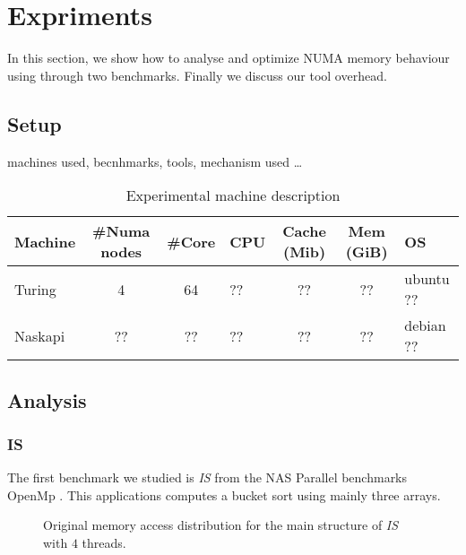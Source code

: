 \section{Expriments}
\label{sec:expe}
In this section, we show how to analyse and optimize NUMA memory behaviour using
\TABARNAC through two benchmarks. Finally we discuss our tool overhead.
\subsection{Setup}
\label{sec:expe-setup}
machines used, becnhmarks, tools, mechanism used \ldots

\begin{table}
    \centering
    \resizebox{\linewidth}{!}
    {
        \begin{tabular}{l|c|c|l|c|c|l}
            Machine & \#Numa nodes & \#Core & CPU & Cache (Mib) & Mem (GiB) & OS\\
            \hline
            Turing & 4 & 64 & ?? & ?? & ?? &  ubuntu ??\\
            \hline
            Naskapi & ?? &?? &?? &?? & ?? &debian ??\\
        \end{tabular}
    }
    \caption{Experimental machine description}
    \label{tab:machines}
\end{table}

\subsection{Analysis}
\label{sec:expe-analysis}

\subsubsection{IS}
The first benchmark we studied is \emph{IS} from the  NAS Parallel benchmarks OpenMp
\cite{Feng04Unstructured}. This applications computes a bucket sort using
mainly three arrays.

\begin{figure}[htb]
    \centering

    \caption{Original memory access distribution for the main structure of
        \emph{IS} with $4$ threads.}
    \label{fig:is-behaviour-orig}
\end{figure}

